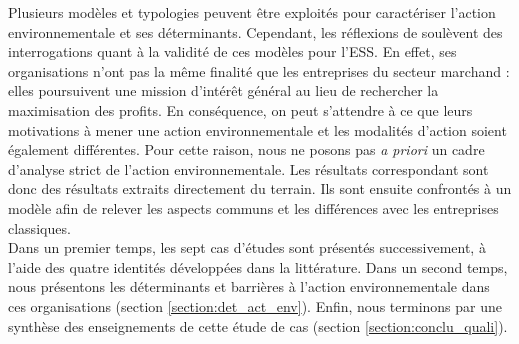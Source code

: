  Plusieurs modèles et typologies peuvent être exploités pour caractériser l'action environnementale et ses déterminants. Cependant, les réflexions de \textcite{dart2010green}
  soulèvent des interrogations quant à la validité de ces modèles pour l'ESS. En effet, ses organisations n'ont pas la même finalité que les entreprises du secteur marchand : elles poursuivent une mission d'intérêt général au lieu de rechercher la maximisation des profits. En conséquence, on peut s'attendre à ce que leurs motivations à mener une action environnementale et les modalités d'action soient également différentes. Pour cette raison, nous ne posons pas \textit{a priori} un cadre d'analyse strict de l'action environnementale. Les résultats correspondant sont donc des résultats extraits directement du terrain. Ils sont ensuite confrontés à un modèle afin de relever les aspects communs et les différences avec les entreprises classiques. \\


 Dans un premier temps, les sept cas d'études sont présentés successivement, à l'aide des quatre identités développées dans la littérature. Dans un second temps, nous présentons les déterminants et barrières à l'action environnementale dans ces organisations (section \ref{section:det_act_env}). Enfin, nous terminons par une synthèse des enseignements de cette étude de cas (section \ref{section:conclu_quali}).
